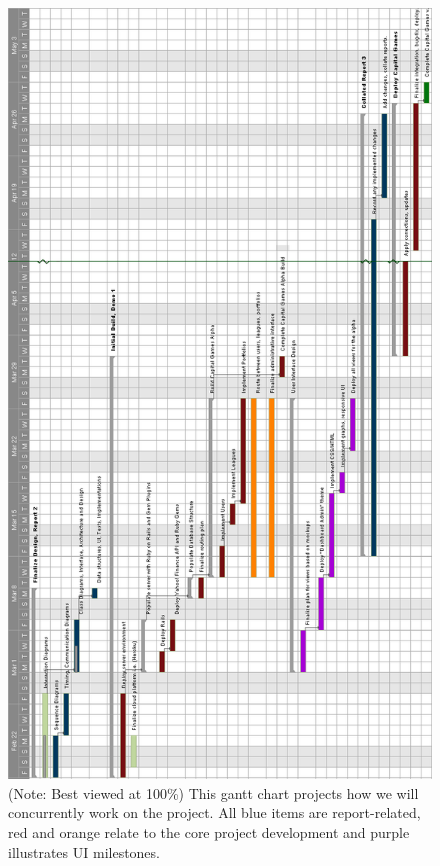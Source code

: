 \hfil\eject \pdfpagewidth=8.5in \pdfpageheight=16in
\begin{figure}
\centering
\includegraphics[width=7in]{./img/gantt.png}
\caption{(Note: Best viewed at 100\%) This gantt chart projects how we will concurrently work on
the project. All blue items are report-related, red and orange relate
to the core project development and purple illustrates UI milestones.}
\end{figure}
%
%
